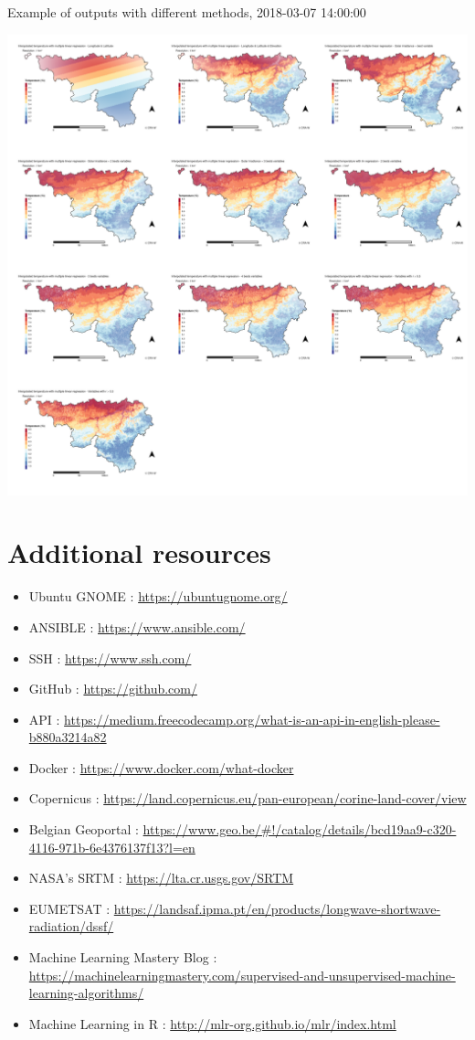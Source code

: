 \documentclass[12pt,twoside]{reedthesis}
\theoremstyle{definition}
\theoremstyle{definition}
\theoremstyle{definition}
\theoremstyle{remark}
\begin{document}
Example of outputs with different methods, 2018-03-07 14:00:00
\begin{center}\includegraphics[width=1\linewidth]{figure/2018-03-07_14} \end{center}

\chapter{Additional resources}\label{additional-resources}
\begin{itemize}
\item
  Ubuntu GNOME : \url{https://ubuntugnome.org/}
\item
  ANSIBLE : \url{https://www.ansible.com/}
\item
  SSH : \url{https://www.ssh.com/}
\item
  GitHub : \url{https://github.com/}
\item
  API :
  \url{https://medium.freecodecamp.org/what-is-an-api-in-english-please-b880a3214a82}
\item
  Docker : \url{https://www.docker.com/what-docker}
\item
  Copernicus :
  \url{https://land.copernicus.eu/pan-european/corine-land-cover/view}
\item
  Belgian Geoportal :
  \url{https://www.geo.be/\#!/catalog/details/bcd19aa9-c320-4116-971b-6e4376137f13?l=en}
\item
  NASA's SRTM : \url{https://lta.cr.usgs.gov/SRTM}
\item
  EUMETSAT :
  \url{https://landsaf.ipma.pt/en/products/longwave-shortwave-radiation/dssf/}
\item
  Machine Learning Mastery Blog :
  \url{https://machinelearningmastery.com/supervised-and-unsupervised-machine-learning-algorithms/}
\item
  Machine Learning in R : \url{http://mlr-org.github.io/mlr/index.html}
\end{itemize}
\end{document}
